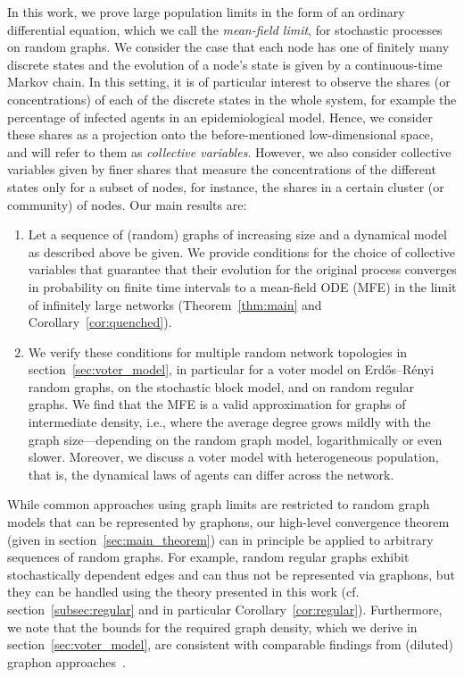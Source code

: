 \documentclass[a4paper,
               10pt,
               pdftex,
               normalheadings,
               headsepline,
               footsepline,
               headinclude,
               footinclude,
               DIV=14,
               abstracton]
{scrartcl}
\newcommand{\review}[1]{{#1}}
\begin{document}
In this work, we prove large population limits in the form of an ordinary differential equation, which we call the \textit{mean-field limit}, for stochastic processes on random graphs.
We consider the case that each node has one of finitely many discrete states and the evolution of a node's state is given by a continuous-time Markov chain.
In this setting, it is of particular interest to observe the shares (or concentrations) of each of the discrete states in the whole system, for example the percentage of infected agents in an epidemiological model.
Hence, we consider these shares as a projection onto the before-mentioned low-dimensional space, and will refer to them as \textit{collective variables}.
However, we also consider collective variables given by finer shares that measure the concentrations of the different states only for a subset of nodes, for instance, the shares in a certain cluster (or community) of nodes.
Our main results are:
\begin{enumerate}
    \item Let a sequence of (random) graphs of increasing size and a dynamical model as described above be given.
    We provide conditions for the choice of collective variables that guarantee that their evolution for the original process converges in probability on finite time intervals to a mean-field ODE (MFE) in the limit of infinitely large networks (Theorem~\ref{thm:main} \review{and Corollary~\ref{cor:quenched}}).
    \item We verify these conditions for multiple random network topologies in section~\ref{sec:voter_model}, in particular for a voter model on Erd\H{o}s--Rényi random graphs, on the stochastic block model, and on random regular graphs. We find that the MFE is a valid approximation for graphs of intermediate density, i.e., where the average degree grows mildly with the graph size---depending on the random graph model, logarithmically or even slower.
    Moreover, we discuss a voter model with heterogeneous population, that is, the dynamical laws of agents can differ across the network.
\end{enumerate}
\review{
While common approaches using graph limits \cite{keliger2022local,Ayi2020} are restricted to random graph models that can be represented by graphons, our high-level convergence theorem (given in section~\ref{sec:main_theorem}) can in principle be applied to arbitrary sequences of random graphs.
For example, random regular graphs exhibit stochastically dependent edges and can thus not be represented via graphons, but they can be handled using the theory presented in this work (cf. section~\ref{subsec:regular} and in particular Corollary~\ref{cor:regular}).
Furthermore, we note that the bounds for the required graph density, which we derive in section~\ref{sec:voter_model}, are consistent with comparable findings from (diluted) graphon approaches~\cite{Bayraktar2020}.
}
\end{document}
